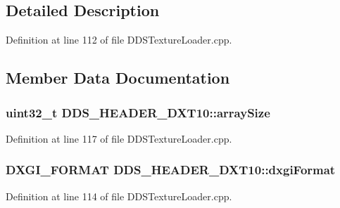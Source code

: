 \subsection{Detailed Description}


Definition at line 112 of file D\+D\+S\+Texture\+Loader.\+cpp.



\subsection{Member Data Documentation}
\subsubsection[{\texorpdfstring{array\+Size}{arraySize}}]{\setlength{\rightskip}{0pt plus 5cm}uint32\+\_\+t D\+D\+S\+\_\+\+H\+E\+A\+D\+E\+R\+\_\+\+D\+X\+T10\+::array\+Size}\hypertarget{struct_d_d_s___h_e_a_d_e_r___d_x_t10_ac4da0d495a89e556d02ac256af28da41_ac4da0d495a89e556d02ac256af28da41}{}\label{struct_d_d_s___h_e_a_d_e_r___d_x_t10_ac4da0d495a89e556d02ac256af28da41_ac4da0d495a89e556d02ac256af28da41}


Definition at line 117 of file D\+D\+S\+Texture\+Loader.\+cpp.

\subsubsection[{\texorpdfstring{dxgi\+Format}{dxgiFormat}}]{\setlength{\rightskip}{0pt plus 5cm}D\+X\+G\+I\+\_\+\+F\+O\+R\+M\+AT D\+D\+S\+\_\+\+H\+E\+A\+D\+E\+R\+\_\+\+D\+X\+T10\+::dxgi\+Format}\hypertarget{struct_d_d_s___h_e_a_d_e_r___d_x_t10_a7208befc03e44222386ee54ee4fa9ec6_a7208befc03e44222386ee54ee4fa9ec6}{}\label{struct_d_d_s___h_e_a_d_e_r___d_x_t10_a7208befc03e44222386ee54ee4fa9ec6_a7208befc03e44222386ee54ee4fa9ec6}


Definition at line 114 of file D\+D\+S\+Texture\+Loader.\+cpp.

